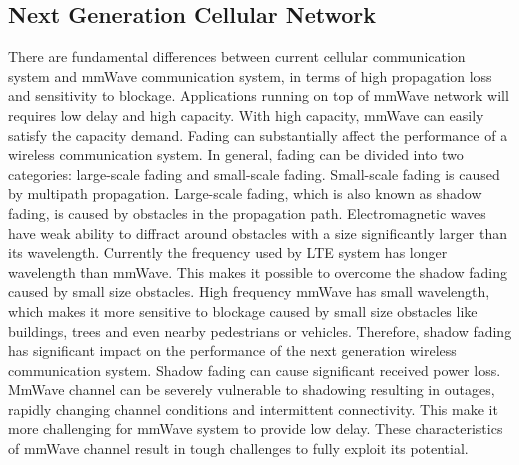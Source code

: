 \subsection{Next Generation Cellular Network}
\par There are fundamental differences between current cellular communication system and mmWave communication system, in terms of high propagation loss and sensitivity to blockage. Applications running on top of mmWave network will requires low delay and high capacity. With high capacity, mmWave can easily satisfy the capacity demand. Fading can substantially affect the performance of a wireless communication system. In general, fading can be divided into two categories: large-scale fading and small-scale fading. Small-scale fading is caused by multipath propagation. Large-scale fading, which is also known as shadow fading, is caused by obstacles in the propagation path. Electromagnetic waves have weak ability to diffract around obstacles with a size significantly larger than its wavelength. Currently the frequency used by LTE system has longer wavelength than mmWave. This makes it possible to overcome the shadow fading caused by small size obstacles. High frequency mmWave has small wavelength, which makes it more sensitive to blockage caused by small size obstacles like buildings, trees and even nearby pedestrians or vehicles. Therefore, shadow fading has significant impact on the performance of the next generation wireless communication system. Shadow fading can cause significant received power loss. MmWave channel can be severely vulnerable to shadowing resulting in outages, rapidly changing channel conditions and intermittent connectivity. This make it more challenging for mmWave system to provide low delay. These characteristics of mmWave channel result in tough challenges to fully exploit its potential. 



